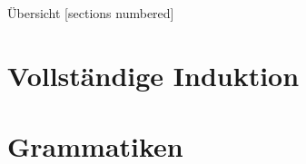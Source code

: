 %
%
%
%



\renewcommand\daynr{3}




\maketitle

\begin{frame}[fragile]{Übersicht}
  [sections numbered]
  \tableofcontents%
\end{frame}

\section{Vollständige Induktion}









\section{Grammatiken}






